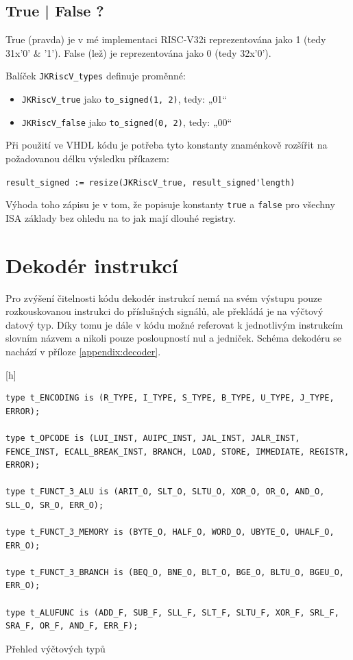 \documentclass[FM,BP]{tulthesis}
\newenvironment{myquote}{\begin{list}{}{\setlength\leftmargin\parindent}\item[]}{\end{list}}
\newenvironment{listing}{\begin{myquote}\color{\tulcolor}}{\end{myquote}}
\begin{document}
\newpage

\subsection{True | False ?} \label{kap:TrueOrFalse}
True (pravda) je v mé implementaci RISC-V32i reprezentována jako 1 (tedy 31x'0' \& '1'). False (lež) je reprezentována jako 0 (tedy 32x'0').

Balíček \verb|JKRiscV_types| definuje proměnné:
\begin{itemize}
    \item \verb|JKRiscV_true| jako \verb|to_signed(1, 2)|, tedy: „01“
    \item \verb|JKRiscV_false| jako \verb|to_signed(0, 2)|, tedy: „00“
\end{itemize}
Při použití ve VHDL kódu je potřeba tyto konstanty znaménkově rozšířit na požadovanou délku výsledku příkazem: 

\verb|result_signed := resize(JKRiscV_true, result_signed'length)|

Výhoda toho zápisu je v tom, že popisuje konstanty \verb|true| a \verb|false| pro všechny ISA základy bez ohledu na to jak mají dlouhé registry. 

\section{Dekodér instrukcí} \label{kap:Dekodér instrukcí}
Pro zvýšení čitelnosti kódu dekodér instrukcí nemá na svém výstupu pouze rozkouskovanou instrukci do příslušných signálů, ale překládá je na výčtový datový typ. Díky tomu je dále v kódu možné referovat k jednotlivým instrukcím slovním názvem a nikoli pouze posloupností nul a jedniček. Schéma dekodéru se nachází v příloze \ref{appendix:decoder}.

\begin{listing}[h]
    \begin{verbatim}
type t_ENCODING is (R_TYPE, I_TYPE, S_TYPE, B_TYPE, U_TYPE, J_TYPE, ERROR);

type t_OPCODE is (LUI_INST, AUIPC_INST, JAL_INST, JALR_INST, FENCE_INST, ECALL_BREAK_INST, BRANCH, LOAD, STORE, IMMEDIATE, REGISTR, ERROR);

type t_FUNCT_3_ALU is (ARIT_O, SLT_O, SLTU_O, XOR_O, OR_O, AND_O, SLL_O, SR_O, ERR_O);

type t_FUNCT_3_MEMORY is (BYTE_O, HALF_O, WORD_O, UBYTE_O, UHALF_O, ERR_O);

type t_FUNCT_3_BRANCH is (BEQ_O, BNE_O, BLT_O, BGE_O, BLTU_O, BGEU_O, ERR_O);

type t_ALUFUNC is (ADD_F, SUB_F, SLL_F, SLT_F, SLTU_F, XOR_F, SRL_F, SRA_F, OR_F, AND_F, ERR_F);
    \end{verbatim}
    \caption{Přehled výčtových typů}
    \label{listing:vhdl_enums}
\end{listing}
\end{document}
